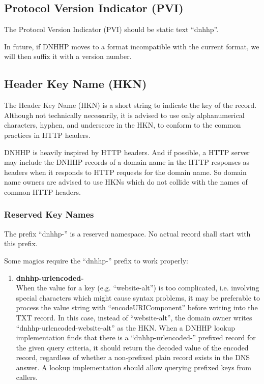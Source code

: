 \documentclass[a4paper,11pt]{article}
\begin{document}
\subsection{Protocol Version Indicator (PVI)}

The Protocol Version Indicator (PVI) should be static text ``dnhhp''.

In future, if DNHHP moves to a format incompatible with the current format, we will then suffix it with a version number.

\subsection{Header Key Name (HKN)}

The Header Key Name (HKN) is a short string to indicate the key of the record.
Although not technically necessarily,
it is advised to use only alphanumerical characters, hyphen, and underscore in the HKN,
to conform to the common practices in HTTP headers.

DNHHP is heavily inspired by HTTP headers.
And if possible, a HTTP server may include the DNHHP records of a domain name in the HTTP responses as headers
when it responds to HTTP requests for the domain name.
So domain name owners are advised to use HKNs which do not collide with the names of common HTTP headers.

\subsubsection{Reserved Key Names}

The prefix ``dnhhp-'' is a reserved namespace.
No actual record shall start with this prefix.

Some magics require the ``dnhhp-'' prefix to work properly:

\begin{enumerate}
	\item \textbf{dnhhp-urlencoded-}\\
	      When the value for a key (e.g. ``website-alt'') is too complicated, i.e. involving special characters which might cause syntax problems,
	      it may be preferable to process the value string with ``encodeURIComponent'' before writing into the TXT record.
	      In this case, instead of ``website-alt'', the domain owner writes ``dnhhp-urlencoded-website-alt'' as the HKN.
	      When a DNHHP lookup implementation finds that there is a ``dnhhp-urlencoded-'' prefixed record for the given query criteria,
	      it should return the decoded value of the encoded record, regardless of whether a non-prefixed plain record exists in the DNS answer.
	      A lookup implementation should allow querying prefixed keys from callers.
\end{enumerate}
\end{document}
